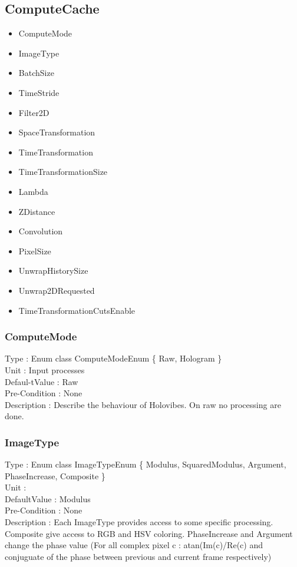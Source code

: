 
\subsection{ComputeCache}
\begin{itemize}
    \item ComputeMode
    \item ImageType
    \item BatchSize
    \item TimeStride
    \item Filter2D
    \item SpaceTransformation
    \item TimeTransformation
    \item TimeTransformationSize
    \item Lambda
    \item ZDistance
    \item Convolution
    \item PixelSize
    \item UnwrapHistorySize
    \item Unwrap2DRequested
    \item TimeTransformationCutsEnable
\end{itemize}

\subsubsection{ComputeMode}
\noindent
Type : Enum class ComputeModeEnum \{ Raw, Hologram \} \\
Unit : Input processes \\
Defaul-tValue : Raw \\
Pre-Condition : None\\
Description : Describe the behaviour of Holovibes. On raw no processing are done.\\

\subsubsection{ImageType}
\noindent
Type : Enum class ImageTypeEnum \{ Modulus, SquaredModulus, Argument, PhaseIncrease, Composite \}\\
Unit : \\
DefaultValue : Modulus\\
Pre-Condition : None\\
Description : Each ImageType provides access to some specific processing. Composite give access to RGB and HSV coloring. PhaseIncrease and Argument change the phase value (For all complex pixel c : atan(Im(c)/Re(c) and conjuguate of the phase between previous and current frame respectively)\\


